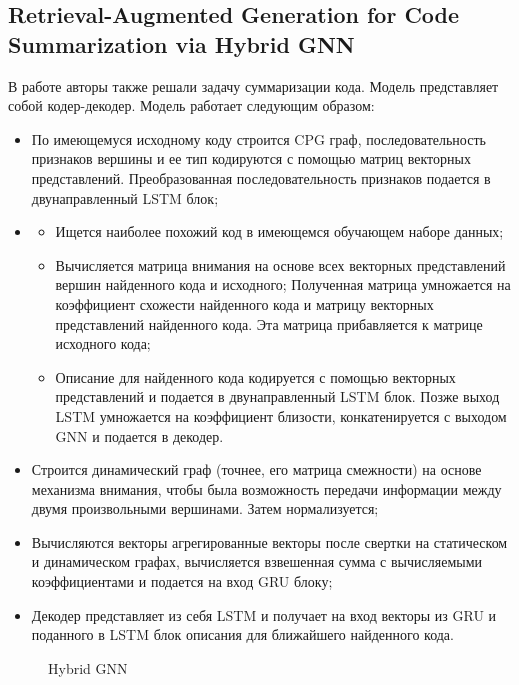 \subsection{Retrieval-Augmented Generation for Code Summarization via Hybrid GNN}
В работе\cite{liu2021retrievalaugmented} авторы также решали задачу суммаризации кода. Модель представляет собой кодер-декодер. Модель работает следующим образом:
\begin{itemize}
    \item По имеющемуся исходному коду строится CPG граф\cite{6956589}, последовательность признаков вершины и ее тип кодируются с помощью матриц векторных представлений. Преобразованная последовательность признаков подается в двунаправленный LSTM блок;
    \item
        \begin{itemize}
            \item Ищется наиболее похожий код в имеющемся обучающем наборе данных;
            \item Вычисляется матрица внимания на основе всех векторных представлений вершин найденного кода и исходного; Полученная матрица умножается на коэффициент схожести найденного кода и матрицу векторных представлений найденного кода. Эта матрица прибавляется к матрице исходного кода;
            \item Описание для найденного кода кодируется с помощью векторных представлений и подается в двунаправленный LSTM блок. Позже выход LSTM умножается на коэффициент близости, конкатенируется с выходом GNN и подается в декодер.
        \end{itemize}
    \item Строится динамический граф (точнее, его матрица смежности) на основе механизма внимания, чтобы была возможность передачи информации между двумя произвольными вершинами. Затем нормализуется;
    \item Вычисляются векторы агрегированные векторы после свертки на статическом и динамическом графах, вычисляется взвешенная сумма с вычисляемыми коэффициентами и подается на вход GRU блоку;
    \item Декодер представляет из себя LSTM и получает на вход векторы из GRU и поданного в LSTM блок описания для ближайшего найденного кода.
\end{itemize}

\begin{figure}[h]
    \caption{Hybrid GNN}
\end{figure}

